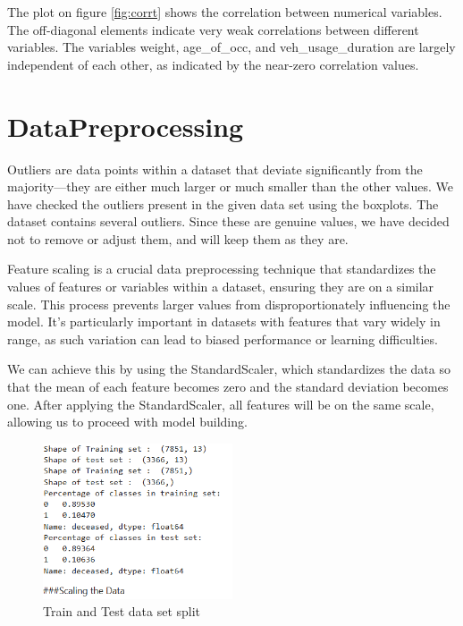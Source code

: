 \documentclass[12pt,a4paper]{article}
\begin{document}
The plot on figure \ref{fig:corrt} shows the correlation between numerical variables. The off-diagonal elements indicate very weak correlations between different variables. The variables weight, age\_of\_occ, and veh\_usage\_duration are largely independent of each other, as indicated by the near-zero correlation values.
	\section{DataPreprocessing}
	Outliers are data points within a dataset that deviate significantly from the majority—they are either much larger or much smaller than the other values. We have checked the outliers present in the given data set using the boxplots. The dataset contains several outliers. Since these are genuine values, we have decided not to remove or adjust them, and will keep them as they are. 
	
	Feature scaling is a crucial data preprocessing technique that standardizes the values of features or variables within a dataset, ensuring they are on a similar scale. This process prevents larger values from disproportionately influencing the model. It's particularly important in datasets with features that vary widely in range, as such variation can lead to biased performance or learning difficulties.
	
	We can achieve this by using the StandardScaler, which standardizes the data so that the mean of each feature becomes zero and the standard deviation becomes one. After applying the StandardScaler, all features will be on the same scale, allowing us to proceed with model building.
	
	\begin{figure}[h]
		\centering
		\includegraphics[width=0.5\textwidth]{train_test_split.png}
		\caption{Train and Test data set split}
		\label{fig:dataset_split}
	\end{figure}
	
\end{document}
